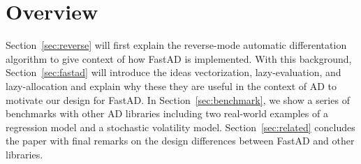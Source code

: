 \section{Overview}

Section~\ref{sec:reverse} will first explain the reverse-mode automatic differentation algorithm
to give context of how FastAD is implemented.
With this background, Section~\ref{sec:fastad} will introduce the ideas
vectorization, lazy-evaluation, and lazy-allocation and explain why these
they are useful in the context of AD to motivate our design for FastAD.
In Section~\ref{sec:benchmark}, we show a series of benchmarks with
other AD libraries including two real-world examples 
of a regression model and a stochastic volatility model.
Section~\ref{sec:related} concludes the paper with final remarks on
the design differences between FastAD and other libraries.
